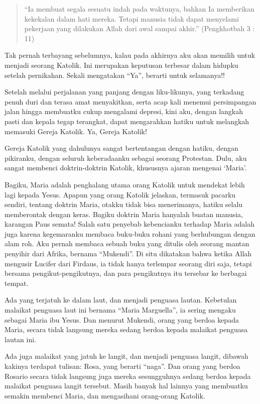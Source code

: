 \begin{quote}
“Ia membuat segala sesuatu indah pada waktunya, bahkan Ia memberikan kekekalan dalam hati mereka. Tetapi manusia tidak dapat menyelami pekerjaan yang dilakukan Allah dari awal sampai akhir.” (Pengkhotbah 3 : 11)
\end{quote}

Tak pernah terbayang sebelumnya, kalau pada akhirnya aku akan memilih untuk menjadi seorang Katolik. Ini merupakan keputusan terbesar dalam hidupku setelah pernikahan. Sekali mengatakan “Ya”, berarti untuk selamanya!!

Setelah melalui perjalanan yang panjang dengan liku-likunya, yang terkadang penuh duri dan terasa amat menyakitkan, serta acap kali menemui persimpangan jalan hingga membuatku cukup mengalami depresi, kini aku, dengan langkah pasti dan kepala tegap terangkat, dapat mengarahkan hatiku untuk melangkah memasuki Gereja Katolik. Ya, Gereja Katolik!

Gereja Katolik yang dahulunya sangat bertentangan dengan hatiku, dengan pikiranku, dengan seluruh keberadaanku sebagai seorang Protestan.
Dulu, aku sangat membenci doktrin-doktrin Katolik, khususnya ajaran mengenai ‘Maria’.

Bagiku, Maria adalah penghalang utama orang Katolik untuk mendekat lebih lagi kepada Yesus. Apapun yang orang Katolik jelaskan, termasuk pacarku sendiri, tentang doktrin Maria, otakku tidak bisa menerimanya, hatiku selalu memberontak dengan keras. Bagiku doktrin Maria hanyalah buatan manusia, karangan Paus semata!
Salah satu penyebab kebencianku terhadap Maria adalah juga karena kegemaranku membaca buku-buku rohani yang berhubungan dengan alam roh. Aku pernah membaca sebuah buku yang ditulis oleh seorang mantan penyihir dari Afrika, bernama “Mukendi”. Di situ dikatakan bahwa ketika Allah mengusir Lucifer dari Firdaus, ia tidak hanya terlempar seorang diri saja, tetapi bersama pengikut-pengikutnya, dan para pengikutnya itu tersebar ke berbagai tempat. 

Ada yang terjatuh ke dalam laut, dan menjadi penguasa lautan. Kebetulan malaikat penguasa laut ini bernama “Maria Marguella”, ia sering mengaku sebagai Maria ibu Yesus. Dan menurut Mukendi, orang yang berdoa kepada Maria, secara tidak langsung mereka sedang berdoa kepada malaikat penguasa lautan ini.

Ada juga malaikat yang jatuh ke langit, dan menjadi penguasa langit, dibawah kakinya terdapat tulisan: Rosa, yang berarti “naga”. Dan orang yang berdoa Rosario secara tidak langsung juga mereka sesungguhnya sedang berdoa kepada malaikat penguasa langit tersebut.
Masih banyak hal lainnya yang membuatku semakin membenci Maria, dan mengasihani orang-orang Katolik.

